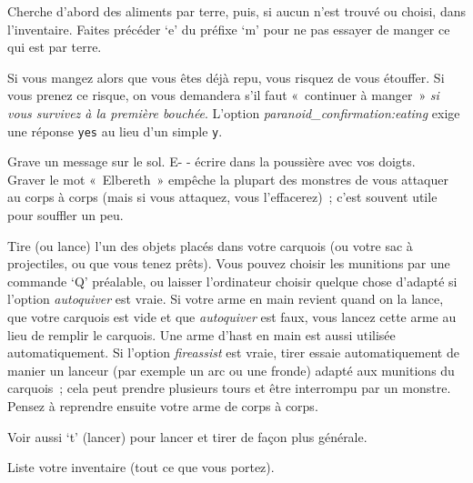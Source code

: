 \documentclass[titlepage]{article}
\begin{document}
\begin{description}
Cherche d'abord des aliments par terre, puis, si aucun n'est trouvé ou
choisi, dans l'inventaire.
Faites précéder `e' du préfixe `m' pour ne pas essayer de
manger ce qui est par terre.


Si vous mangez alors que vous êtes déjà repu, vous risquez de vous
étouffer.
Si vous prenez ce risque, on vous demandera s'il faut «~continuer à
manger~» \textit{si vous survivez à la première bouchée}.
L'option
\textit{paranoid\_confirmation:eating}
exige une réponse \texttt{yes} au lieu d'un simple \texttt{y}.

\item[{E}]
Grave un message sur le sol.
E- - écrire dans la poussière avec vos doigts.\\


Graver le mot «~Elbereth~» empêche la plupart des monstres de vous
attaquer au corps à corps (mais si vous attaquez, vous l'effacerez)~; c'est
souvent utile pour souffler un peu.

\item[{f}]
Tire (ou lance) l'un des objets placés dans votre carquois (ou votre sac à
projectiles, ou que vous tenez prêts).
Vous pouvez choisir les munitions par une commande `Q' préalable, ou
laisser l'ordinateur choisir quelque chose d'adapté si l'option
\textit{autoquiver}
est vraie.
Si votre arme en main revient quand on la lance, que votre carquois est
vide et que
\textit{autoquiver}
est faux, vous lancez cette arme au lieu de remplir le carquois.
Une arme d'hast en main est aussi utilisée automatiquement.
Si l'option
\textit{fireassist}
est vraie, tirer essaie automatiquement de manier un lanceur (par exemple
un arc ou une fronde) adapté aux munitions du carquois~; cela peut prendre
plusieurs tours et être interrompu par un monstre.
Pensez à reprendre ensuite votre arme de corps à corps.


Voir aussi `t' (lancer) pour lancer et tirer de façon plus
générale.

\item[{i}]
Liste votre inventaire (tout ce que vous portez).


\end{description}
\end{document}
